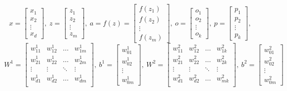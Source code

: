 \documentclass{article}
\begin{document}
$$x =
\begin{bmatrix}
    x_1 \\
    x_2 \\
    \vdots \\
    x_d
\end{bmatrix},\
z = 
\begin{bmatrix}
    z_1 \\
    z_2 \\
    \vdots \\
    z_m
\end{bmatrix},\
a = f(z) = 
\begin{bmatrix}
    f(z_1) \\
    f(z_2) \\
    \vdots \\
    f(z_m)
\end{bmatrix},\
o =
\begin{bmatrix}
    o_1 \\
    o_2 \\
    \vdots \\
    o_k
\end{bmatrix},\
p =
\begin{bmatrix}
    p_1 \\
    p_2 \\
    \vdots \\
    p_k
\end{bmatrix},\
$$
$$W^1 =
\begin{bmatrix}
    w_{11}^1 & w_{12}^1 & \dots & w_{1m}^1 \\
    w_{21}^1 & w_{22}^1 & \dots & w_{2m}^1 \\
    \vdots & \vdots & \ddots & \vdots \\
    w_{d1}^1 & w_{d2}^1 & \dots & w_{dm}^1 \\
\end{bmatrix},\
b^1 =
\begin{bmatrix}
    w_{01}^1 \\
    w_{02}^1 \\
    \vdots \\
    w_{0m}^1
\end{bmatrix},\
W^2 =
\begin{bmatrix}
    w_{11}^2 & w_{12}^2 & \dots & w_{1k}^2 \\
    w_{21}^2 & w_{22}^2 & \dots & w_{2k}^2 \\
    \vdots & \vdots & \ddots & \vdots \\
    w_{d1}^2 & w_{d2}^2 & \dots & w_{mk}^2 \\
\end{bmatrix},\
b^2 =
\begin{bmatrix}
    w_{01}^2 \\
    w_{02}^2 \\
    \vdots \\
    w_{0m}^2
\end{bmatrix}
$$
\end{document}
